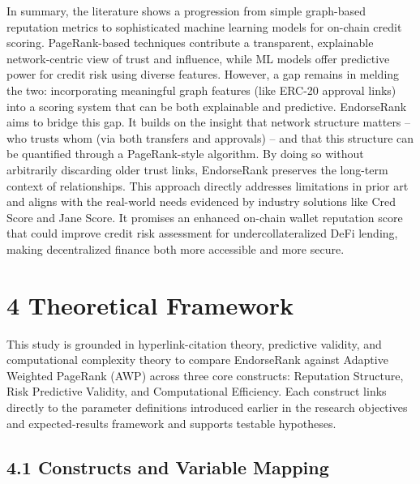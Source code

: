\documentclass[12pt]{article}
\begin{document}
In summary, the literature shows a progression from simple graph-based reputation metrics to sophisticated machine learning models for on-chain credit scoring. PageRank-based techniques contribute a transparent, explainable network-centric view of trust and influence, while ML models offer predictive power for credit risk using diverse features. However, a gap remains in melding the two: incorporating meaningful graph features (like ERC-20 approval links) into a scoring system that can be both explainable and predictive. EndorseRank aims to bridge this gap. It builds on the insight that network structure matters -- who trusts whom (via both transfers and approvals) -- and that this structure can be quantified through a PageRank-style algorithm. By doing so without arbitrarily discarding older trust links, EndorseRank preserves the long-term context of relationships. This approach directly addresses limitations in prior art and aligns with the real-world needs evidenced by industry solutions like Cred Score and Jane Score. It promises an enhanced on-chain wallet reputation score that could improve credit risk assessment for undercollateralized DeFi lending, making decentralized finance both more accessible and more secure.


\clearpage
{}
\section*{4 \textbf{Theoretical Framework}}
\label{sec:theoretical-framework}

This study is grounded in hyperlink-citation theory, predictive validity, and computational complexity theory to compare EndorseRank against Adaptive Weighted PageRank (AWP) across three core constructs: Reputation Structure, Risk Predictive Validity, and Computational Efficiency. Each construct links directly to the parameter definitions introduced earlier in the research objectives and expected-results framework and supports testable hypotheses.


\subsection*{4.1 Constructs and Variable Mapping}
\label{sec:constructs-and-variable-mapping}
\end{document}
